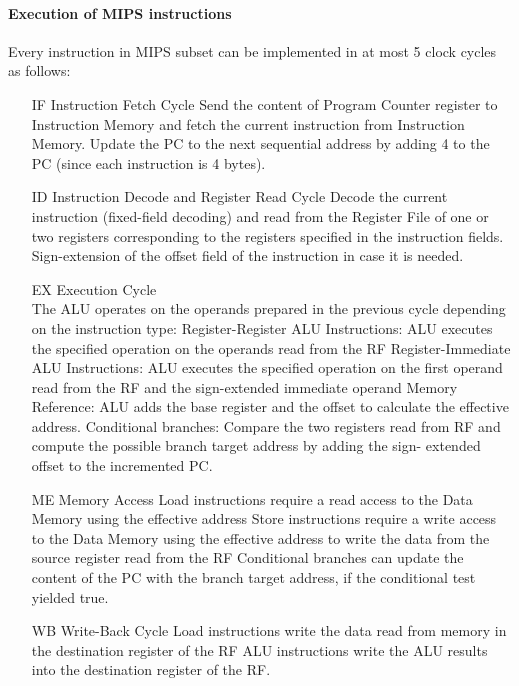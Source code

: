 \paragraph{Execution of MIPS instructions} Every instruction in MIPS subset can be implemented in at most 5 clock
cycles as follows:
\begin{enumerate}
    \item[IF] Instruction Fetch Cycle
        \subitem Send the content of Program Counter register to Instruction Memory and fetch the
        current instruction from Instruction Memory.
        Update the PC to the next sequential address by adding 4 to the PC (since each instruction is 4 bytes).

    \item[ID] Instruction Decode and Register Read Cycle
        \subitem Decode the current instruction (fixed-field decoding)
        and read from the Register File of one or two registers
        corresponding to the registers specified in the
        instruction fields.
        \subitem Sign-extension of the offset field of the instruction in
        case it is needed.

    \item[EX] Execution Cycle\\
    The ALU operates on the operands prepared in the
    previous cycle depending on the instruction type:
        \subitem Register-Register ALU Instructions: ALU executes the specified operation on the operands read
        from the RF
        \subitem Register-Immediate ALU Instructions:
        ALU executes the specified operation on the first operand
        read from the RF and the sign-extended immediate operand
        \subitem Memory Reference:
        ALU adds the base register and the offset to calculate the
        effective address.
        \subitem Conditional branches:
        Compare the two registers read from RF and compute the
        possible branch target address by adding the sign-
        extended offset to the incremented PC\@.

    \item[ME] Memory Access
        \subitem Load instructions require a read access to the Data
        Memory using the effective address
        \subitem Store instructions require a write access to the Data
        Memory using the effective address to write the data
        from the source register read from the RF
        \subitem Conditional branches can update the content of the PC
        with the branch target address, if the conditional test
        yielded true.

    \item[WB] Write-Back Cycle
        \subitem Load instructions write the data read from memory in
        the destination register of the RF
        \subitem ALU instructions write the ALU results into the
        destination register of the RF\@.
\end{enumerate}


